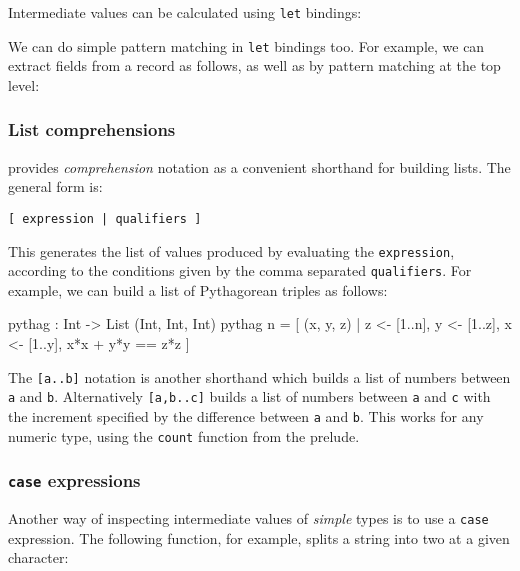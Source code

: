 Intermediate values can be calculated using \texttt{let} bindings:


\noindent
We can do simple pattern matching in \texttt{let} bindings too.
For example, we can extract fields from a record as follows, as well as by pattern matching at the top level:


\subsubsection*{List comprehensions}
\label{sec:listcomp}

\Idris{} provides \emph{comprehension} notation as a convenient shorthand for building lists.
The general form is:

\begin{lstlisting}[style=stdout]
[ expression | qualifiers ]
\end{lstlisting}

\noindent
This generates the list of values produced by evaluating the \texttt{expression}, according to the conditions given by the comma separated \texttt{qualifiers}.
For example, we can build a list of Pythagorean triples as follows:

\begin{code}
pythag : Int -> List (Int, Int, Int)
pythag n = [ (x, y, z) | z <- [1..n], y <- [1..z], x <- [1..y],
                         x*x + y*y == z*z ]
\end{code}


\noindent
The \texttt{[a..b]} notation is another shorthand which builds a list of numbers between \texttt{a} and \texttt{b}.
Alternatively \texttt{[a,b..c]} builds a list of numbers between \texttt{a} and \texttt{c} with the increment specified by the difference between \texttt{a} and \texttt{b}.
This works for any numeric type, using the \texttt{count} function from the prelude.

\subsubsection*{\texttt{case} expressions}

Another way of inspecting intermediate values of \emph{simple} types
is to use a \texttt{case} expression.
The following function, for example, splits a string into two at a given character:

